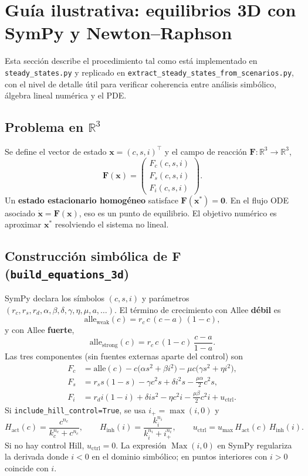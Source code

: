 \documentclass[11pt,a4paper]{article}
\begin{document}
\section{Guía ilustrativa: equilibrios 3D con SymPy y Newton--Raphson}

Esta sección describe el procedimiento tal como está implementado en \texttt{steady\_states.py} y replicado en \texttt{extract\_steady\_states\_from\_scenarios.py}, con el nivel de detalle útil para verificar coherencia entre análisis simbólico, álgebra lineal numérica y el PDE.

\subsection[Problema en tres dimensiones]{Problema en $\mathbb{R}^3$}

Se define el vector de estado $\mathbf{x}=(c,s,i)^\top$ y el campo de reacción $\mathbf{F}:\mathbb{R}^3\to\mathbb{R}^3$,
\[
\mathbf{F}(\mathbf{x}) = \begin{pmatrix} F_c(c,s,i) \\ F_s(c,s,i) \\ F_i(c,s,i) \end{pmatrix}.
\]
Un \textbf{estado estacionario homogéneo} satisface $\mathbf{F}(\mathbf{x}^\ast)=\mathbf{0}$. En el flujo ODE asociado $\dot{\mathbf{x}}=\mathbf{F}(\mathbf{x})$, eso es un punto de equilibrio. El objetivo numérico es aproximar $\mathbf{x}^\ast$ resolviendo el sistema no lineal.

\subsection[Construcción simbólica de F]{Construcción simbólica de $\mathbf{F}$ (\texttt{build\_equations\_3d})}

SymPy declara los símbolos $(c,s,i)$ y parámetros $(r_c,r_s,r_d,\alpha,\beta,\delta,\gamma,\eta,\mu,a,\ldots)$. El término de crecimiento con Allee \textbf{débil} es
\[
\mathrm{alle}_{\mathrm{weak}}(c)= r_c\,c\,(c-a)\,(1-c),
\]
y con Allee \textbf{fuerte},
\[
\mathrm{alle}_{\mathrm{strong}}(c)= r_c\,c\,(1-c)\,\frac{c-a}{1-a}.
\]
Las tres componentes (sin fuentes externas aparte del control) son
\begin{align*}
F_c &= \mathrm{alle}(c) - c\big(\alpha s^2 + \beta i^2\big) - \mu c\big(\gamma s^2 + \eta i^2\big), \\
F_s &= r_s s(1-s) - \gamma c^2 s + \delta i^2 s - \tfrac{\mu\alpha}{2} c^2 s, \\
F_i &= r_d i(1-i) + \delta i s^2 - \eta c^2 i - \tfrac{\mu\beta}{2} c^2 i + u_{\mathrm{ctrl}}.
\end{align*}
Si \texttt{include\_hill\_control=True}, se usa $i_+=\max(i,0)$ y
\[
H_{\mathrm{act}}(c)=\frac{c^{n_c}}{k_c^{n_c}+c^{n_c}},\qquad
H_{\mathrm{inh}}(i)=\frac{k_i^{n_i}}{k_i^{n_i}+i_+^{n_i}},\qquad
u_{\mathrm{ctrl}} = u_{\max}\,H_{\mathrm{act}}(c)\,H_{\mathrm{inh}}(i).
\]
Si no hay control Hill, $u_{\mathrm{ctrl}}=0$. La expresión $\operatorname{Max}(i,0)$ en SymPy regulariza la derivada donde $i<0$ en el dominio simbólico; en puntos interiores con $i>0$ coincide con $i$.
\end{document}
